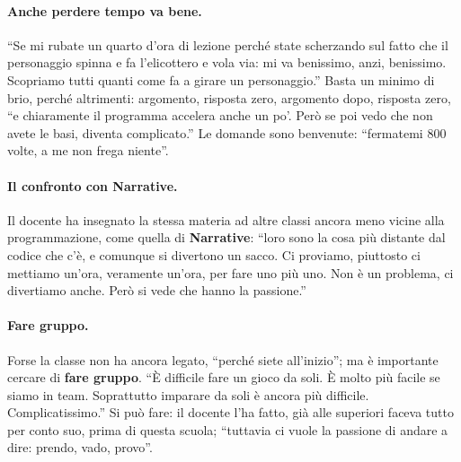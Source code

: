\paragraph{Anche perdere tempo va bene.} ``Se mi rubate un quarto d'ora di lezione
perché state scherzando sul fatto che il personaggio spinna e fa l'elicottero e
vola via: mi va benissimo, anzi, benissimo. Scopriamo tutti quanti come fa a
girare un personaggio.'' Basta un minimo di brio, perché altrimenti: argomento,
risposta zero, argomento dopo, risposta zero, ``e chiaramente il programma
accelera anche un po'. Però se poi vedo che non avete le basi, diventa
complicato.'' Le domande sono benvenute: ``fermatemi 800 volte, a me non frega
niente''.

\paragraph{Il confronto con Narrative.} Il docente ha insegnato la stessa materia
ad altre classi ancora meno vicine alla programmazione, come quella di
\textbf{Narrative}: ``loro sono la cosa più distante dal codice che c'è, e
comunque si divertono un sacco. Ci proviamo, piuttosto ci mettiamo un'ora,
veramente un'ora, per fare uno più uno. Non è un problema, ci divertiamo
anche. Però si vede che hanno la passione.''

\paragraph{Fare gruppo.} Forse la classe non ha ancora legato, ``perché siete
all'inizio''; ma è importante cercare di \textbf{fare gruppo}. ``È difficile fare
un gioco da soli. È molto più facile se siamo in team. Soprattutto imparare da
soli è ancora più difficile. Complicatissimo.'' Si può fare: il docente l'ha
fatto, già alle superiori faceva tutto per conto suo, prima di questa scuola;
``tuttavia ci vuole la passione di andare a dire: prendo, vado, provo''.

